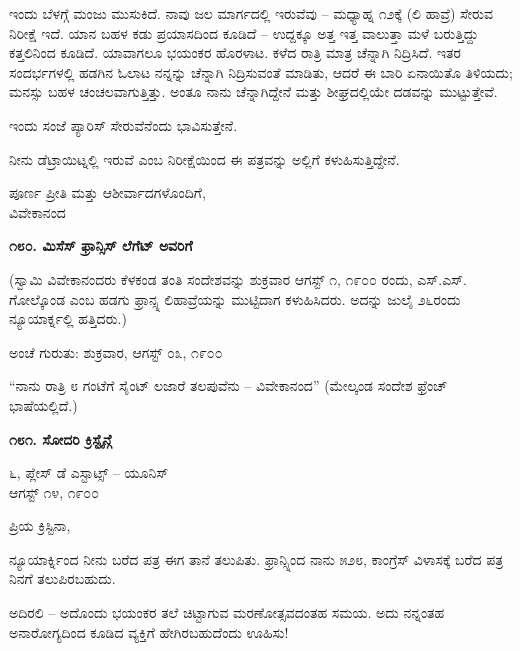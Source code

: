 ಇಂದು ಬೆಳಗ್ಗೆ ಮಂಜು ಮುಸುಕಿದೆ. ನಾವು ಜಲ ಮಾರ್ಗದಲ್ಲಿ ಇರುವೆವು – ಮಧ್ಯಾಹ್ನ ೧೨ಕ್ಕೆ (ಲಿ ಹಾವ್ರೆ) ಸೇರುವ ನಿರೀಕ್ಷೆ ಇದೆ. ಯಾನ ಬಹಳ ಕಡು ಪ್ರಯಾಸದಿಂದ ಕೂಡಿದೆ – ಉದ್ದಕ್ಕೂ ಅತ್ತ ಇತ್ತ ವಾಲುತ್ತಾ ಮಳೆ ಬರುತ್ತಿದ್ದು ಕತ್ತಲಿನಿಂದ ಕೂಡಿದೆ. ಯಾವಾಗಲೂ ಭಯಂಕರ ಹೊರಳಾಟ. ಕಳೆದ ರಾತ್ರಿ ಮಾತ್ರ ಚೆನ್ನಾಗಿ ನಿದ್ರಿಸಿದೆ. ಇತರ ಸಂದರ್ಭಗಳಲ್ಲಿ ಹಡಗಿನ ಓಲಾಟ ನನ್ನನ್ನು ಚೆನ್ನಾಗಿ ನಿದ್ರಿಸುವಂತೆ ಮಾಡಿತು, ಆದರೆ ಈ ಬಾರಿ ಏನಾಯಿತೊ ತಿಳಿಯದು; ಮನಸ್ಸು ಬಹಳ ಚಂಚಲವಾಗುತ್ತಿತ್ತು. ಅಂತೂ ನಾನು ಚೆನ್ನಾಗಿದ್ದೇನೆ ಮತ್ತು ಶೀಘ್ರದಲ್ಲಿಯೇ ದಡವನ್ನು ಮುಟ್ಟುತ್ತೇವೆ.

ಇಂದು ಸಂಜೆ ಪ್ಯಾರಿಸ್ ಸೇರುವೆನೆಂದು ಭಾವಿಸುತ್ತೇನೆ.

ನೀನು ಡೆಟ್ರಾಯಿಟ್ನಲ್ಲಿ ಇರುವೆ ಎಂಬ ನಿರೀಕ್ಷೆಯಿಂದ ಈ ಪತ್ರವನ್ನು ಅಲ್ಲಿಗೆ ಕಳುಹಿಸುತ್ತಿದ್ದೇನೆ.

\begin{flushright}
ಪೂರ್ಣ ಪ್ರೀತಿ ಮತ್ತು ಆಶೀರ್ವಾದಗಳೊಂದಿಗೆ,\\ವಿವೇಕಾನಂದ
\end{flushright}

\begin{center}
\textbf{೧೮೦. ಮಿಸೆಸ್ ಫ್ರಾನ್ಸಿಸ್ ಲೆಗೆಟ್ ಅವರಿಗೆ}
\end{center}

\begin{center}
(ಸ್ವಾಮಿ ವಿವೇಕಾನಂದರು ಕೆಳಕಂಡ ತಂತಿ ಸಂದೇಶವನ್ನು ಶುಕ್ರವಾರ ಆಗಸ್ಟ್ ೧, ೧೯೦೦ ರಂದು, ಎಸ್.ಎಸ್. ಗೋಲ್ಕೊಂಡ ಎಂಬ ಹಡಗು ಫ್ರಾನ್ಸ್ನ ಲಿಹಾವ್ರೆಯನ್ನು ಮುಟ್ಟಿದಾಗ ಕಳುಹಿಸಿದರು. ಅದನ್ನು ಜುಲೈ ೨೬ರಂದು ನ್ಯೂಯಾರ್ಕ್ನಲ್ಲಿ ಹತ್ತಿದರು.)
\end{center}

\begin{flushright}
ಅಂಚೆ ಗುರುತು: ಶುಕ್ರವಾರ, ಆಗಸ್ಟ್ ೦೩, ೧೯೦೦
\end{flushright}

“ನಾನು ರಾತ್ರಿ ೮ ಗಂಟೆಗೆ ಸೈಂಟ್ ಲಜಾರೆ ತಲಪುವೆನು – ವಿವೇಕಾನಂದ” (ಮೇಲ್ಕಂಡ ಸಂದೇಶ ಫ್ರೆಂಚ್ ಭಾಷೆಯಲ್ಲಿದೆ.)

\begin{center}
\textbf{೧೮೧. ಸೋದರಿ ಕ್ರಿಸ್ಟೈನ್ಗೆ}
\end{center}

\begin{flushright}
೬, ಪ್ಲೇಸ್ ಡೆ ಎಸ್ಟಾಟ್ಸ್ – ಯೂನಿಸ್\\ಆಗಸ್ಟ್ ೧೪, ೧೯೦೦
\end{flushright}

ಪ್ರಿಯ ಕ್ರಿಸ್ಟಿನಾ,

ನ್ಯೂಯಾರ್ಕ್ನಿಂದ ನೀನು ಬರೆದ ಪತ್ರ ಈಗ ತಾನೆ ತಲುಪಿತು. ಫ್ರಾನ್ಸ್ನಿಂದ ನಾನು ೫೨೮, ಕಾಂಗ್ರೆಸ್ ವಿಳಾಸಕ್ಕೆ ಬರೆದ ಪತ್ರ ನಿನಗೆ ತಲುಪಿರಬಹುದು.

ಅದಿರಲಿ – ಅದೊಂದು ಭಯಂಕರ ತಲೆ ಚಿಟ್ಟಾಗುವ ಮರಣೋತ್ಸವದಂತಹ ಸಮಯ. ಅದು ನನ್ನಂತಹ ಅನಾರೋಗ್ಯದಿಂದ ಕೂಡಿದ ವ್ಯಕ್ತಿಗೆ ಹೇಗಿರಬಹುದೆಂದು ಊಹಿಸು!

